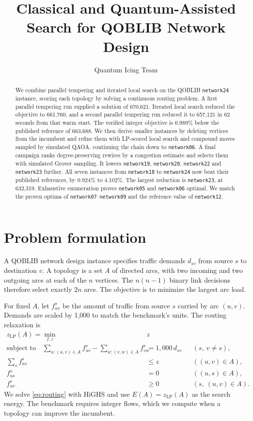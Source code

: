 \documentclass[a4paper]{article}
\title{Classical and Quantum-Assisted Search for QOBLIB Network Design}
\author{Quantum Icing Team}
\date{}
\begin{document}
\maketitle

\begin{abstract}
We combine parallel tempering and iterated local search on the QOBLIB \texttt{network24} instance, scoring each topology
by solving a continuous routing problem. A first parallel tempering run supplied a solution of 670,621.
Iterated local search reduced the objective to 661,760, and a second parallel tempering run reduced it to 657,121
in 62 seconds from that warm start. The verified integer objective is 0.989\% below the published reference of 663,688.
We then derive smaller instances by deleting vertices from the incumbent and refine them with LP-scored local search
and compound moves sampled by simulated QAOA, continuing the chain down to \texttt{network06}.
A final campaign ranks degree-preserving rewires by a congestion estimate and selects them with simulated Grover sampling.
It lowers \texttt{network19}, \texttt{network20}, \texttt{network22} and \texttt{network23} further.
All seven instances from \texttt{network18} to \texttt{network24} now beat their published references, by 0.924\% to 4.102\%.
The largest reduction is \texttt{network23}, at 632,319.
Exhaustive enumeration proves \texttt{network05} and \texttt{network06} optimal. We match the proven optima of
\texttt{network07}--\texttt{network09} and the reference value of \texttt{network12}.
\end{abstract}

\section{Problem formulation}

A QOBLIB network design instance specifies traffic demands \(d_{sv}\) from source \(s\) to destination \(v\).
A topology is a set \(A\) of directed arcs, with two incoming and two outgoing arcs at each of the \(n\) vertices.
The \(n(n-1)\) binary link decisions therefore select exactly \(2n\) arcs. The objective is to minimize the largest arc load.

For fixed \(A\), let \(f^s_{uv}\) be the amount of traffic from source \(s\) carried by arc \((u,v)\).
Demands are scaled by 1,000 to match the benchmark's units. The routing relaxation is
\begin{equation}
\label{eq:routing}
\begin{aligned}
z_{\mathrm{LP}}(A) = \min_{f,z}\;& z\\
\text{subject to}\quad
\sum_{u:(u,v)\in A} f^s_{uv} - \sum_{w:(v,w)\in A} f^s_{vw}
  &= 1{,}000\,d_{sv} && (s,\ v\ne s),\\
\sum_s f^s_{uv} &\le z && ((u,v)\in A),\\
f^s_{us}&=0 && ((u,s)\in A),\\
f^s_{uv}&\ge 0 && (s,\ (u,v)\in A).
\end{aligned}
\end{equation}
We solve \eqref{eq:routing} with HiGHS and use \(E(A)=z_{\mathrm{LP}}(A)\) as the search energy.
The benchmark requires integer flows, which we compute when a topology can improve the incumbent.
\end{document}
